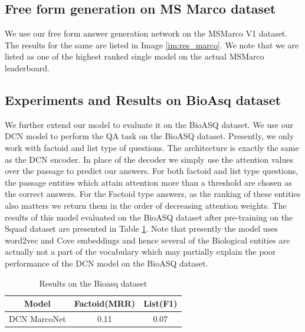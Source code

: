 \subsection{Free form generation on MS Marco dataset}
We use our free form answer generation network on the MSMarco V1 dataset. The results for the same are listed in Image \ref{im:res_marco}. We note that we are listed as one of the highest ranked single model on the actual MSMarco leaderboard.


\subsection{Experiments and Results on BioAsq dataset}
We further extend our model to evaluate it on the BioASQ dataset. We use our DCN model to perform the QA task on the BioASQ dataset. Presently, we only work with factoid and list type of questions. The architecture is exactly the same as the DCN encoder. In place of the decoder we simply use the attention values over the passage to predict our answers. For both factoid and list type questions, the passage entities which attain attention more than a threshold are chosen as the correct answers. For the Factoid type answers, as the ranking of these entities also matters we return them in the order of decreasing attention weights. The results of this model evaluated on the BioASQ dataset after pre-training on the Squad dataset are presented in Table \ref{tab:bioasq_res}. Note that presently the model uses word2vec and Cove embeddings and hence several of the Biological entities are actually not a part of the vocabulary which may partially explain the poor performance of the DCN model on the BioASQ dataset.

\begin{table}
\begin{tabular}{|c|c|c|}
    \hline \hline
    Model & Factoid(MRR) & List(F1)\\
    \hline
    DCN MarcoNet& 0.11&0.07\\
    \hline \hline
\end{tabular}
    \caption{Results on the Bioasq dataset}
    \label{tab:bioasq_res}
\end{table}
